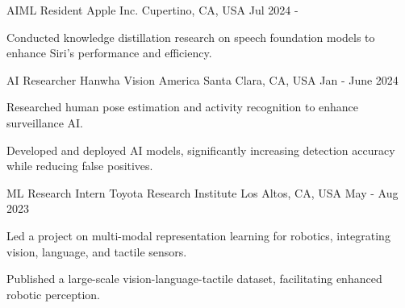 


\begin{cventries}
\cventry
{AIML Resident} %
{Apple Inc.} %
{Cupertino, CA, USA} %
{Jul 2024 - } %
{ %
\begin{cvitems}
    \item Conducted knowledge distillation research on speech foundation models to enhance Siri’s performance and efficiency.
\end{cvitems}
}


\cventry
{AI Researcher} %
{Hanwha Vision America} %
{Santa Clara, CA, USA} %
{Jan - June 2024} %
{ %
\begin{cvitems}
    \item Researched human pose estimation and activity recognition to enhance surveillance AI.
	\item Developed and deployed AI models, significantly increasing detection accuracy while reducing false positives.
\end{cvitems}
}


\cventry
{ML Research Intern} %
{Toyota Research Institute} %
{Los Altos, CA, USA} %
{May - Aug 2023} %
{ %
\begin{cvitems}
    \item Led a project on multi-modal representation learning for robotics, integrating vision, language, and tactile sensors.
	\item Published a large-scale vision-language-tactile dataset, facilitating enhanced robotic perception.
\end{cvitems}
}


\end{cventries}
